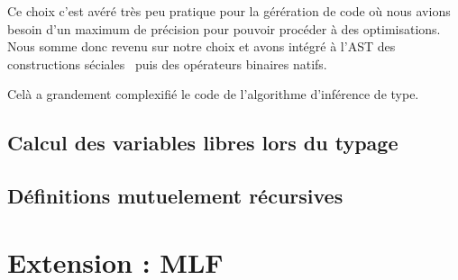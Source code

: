 \documentclass[a4paper]{article}
\begin{document}
Ce choix c'est avéré très peu pratique pour la gérération de code où
nous avions besoin d'un maximum de précision pour pouvoir procéder à
des optimisations. Nous somme donc revenu sur notre choix et avons
intégré à l'AST des \og constructions séciales \fg~puis des opérateurs
binaires natifs.

Celà a grandement complexifié le code de l'algorithme d'inférence de type.

\subsection{Calcul des variables libres lors du typage}

\subsection{Définitions mutuelement récursives}

\section{Extension : MLF}
\end{document}
